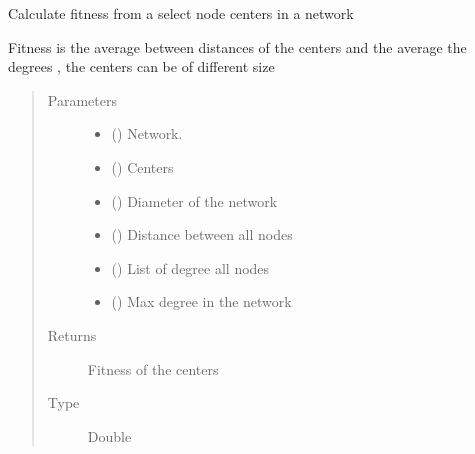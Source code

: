 \documentclass[letterpaper,10pt,english]{sphinxmanual}
\begin{document}
\begin{fulllineitems}
\label{\detokenize{SimulatedAnnealing:SimulatedAnnealing.SimulatedAnnealing.calculateFitness}}
Calculate fitness from a select node centers in a network

Fitness is the average between distances of the centers and the average the degrees , the centers can be of different size
\begin{quote}\begin{description}
\item[{Parameters}] \leavevmode\begin{itemize}
\item {} 
 () \textendash{} Network.

\item {} 
 () \textendash{} Centers

\item {} 
 () \textendash{} Diameter of the network

\item {} 
 () \textendash{} Distance between all nodes

\item {} 
 () \textendash{} List of degree all nodes

\item {} 
 () \textendash{} Max degree in the network

\end{itemize}

\item[{Returns}] \leavevmode
Fitness of the centers

\item[{Type}] \leavevmode
Double

\end{description}\end{quote}

\end{fulllineitems}
\end{document}

